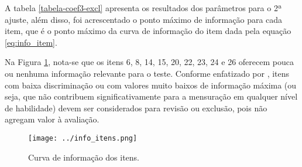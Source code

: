 
  A tabela \ref{tabela-coef3-excl} apresenta os resultados dos parâmetros para o 2ª ajuste, além disso, foi acrescentado o ponto máximo de informação para cada item, que é o ponto máximo da curva de informação do item  dada pela equação \ref{eq:info_item}.

Na Figura \ref{fig:info_itens}, nota-se que os itens 6, 8, 14, 15, 20, 22, 23, 24 e 26 oferecem pouca ou nenhuma informação relevante para o teste. Conforme enfatizado por , itens com baixa discriminação ou com valores muito baixos de informação máxima (ou seja, que não contribuem significativamente para a mensuração em qualquer nível de habilidade) devem ser considerados para revisão ou exclusão, pois não agregam valor à avaliação.



\begin{figure}[!ht]
	\centering
	\texttt{[image: ../info\_itens.png]}
	\caption{Curva de informação dos itens.}
	\label{fig:info_itens}
\end{figure}

